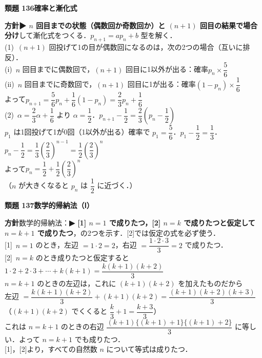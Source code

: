 \documentclass[a4paper,11pt]{ltjsarticle}
\newcommand{\ans}[2]{\Needspace{5\baselineskip}\vspace{6pt}%
  {\sffamily\bfseries 類題 #1\quad #2}\par}
\newcommand{\point}[1]{\textsf{\bfseries ▶ #1}}
\begin{document}
\ans{136}{確率と漸化式}
\begin{kai}
\textbf{方針}\quad \point{$n$ 回目までの状態（偶数回か奇数回か）と $(n+1)$ 回目の結果で場合分け}して漸化式をつくる．$p_{n+1}=ap_n+b$ 型を解く．\\[2pt]
(1)\ $(n+1)$ 回投げて1の目が偶数回になるのは，次の2つの場合（互いに排反）．\\
\hspace*{1.5em}(i)\ $n$ 回目までに偶数回で，$(n+1)$ 回目に1以外が出る：確率\quad $p_n\times\dfrac56$\\
\hspace*{1.5em}(ii)\ $n$ 回目までに奇数回で，$(n+1)$ 回目に1が出る：確率\quad $(1-p_n)\times\dfrac16$\\
\hspace*{1.5em}よって\quad $p_{n+1}=\dfrac56p_n+\dfrac16(1-p_n)=\dfrac23p_n+\dfrac16$\\[2pt]
(2)\ $\alpha=\dfrac23\alpha+\dfrac16$ より $\alpha=\dfrac12$．\quad $p_{n+1}-\dfrac12=\dfrac23\left(p_n-\dfrac12\right)$\\
\hspace*{1.5em}$p_1$ は1回投げて1が0回（1以外が出る）確率で $p_1=\dfrac56$．$p_1-\dfrac12=\dfrac13$．\\
\hspace*{1.5em}$p_n-\dfrac12=\dfrac13\left(\dfrac23\right)^{n-1}=\dfrac12\left(\dfrac23\right)^n$\\
\hspace*{1.5em}よって\quad $p_n=\dfrac12+\dfrac12\left(\dfrac23\right)^n$\\
\hspace*{1.5em}（$n$ が大きくなると $p_n$ は $\dfrac12$ に近づく．）
\end{kai}

\ans{137}{数学的帰納法（Ⅰ）}
\begin{kai}
\textbf{方針}\quad 数学的帰納法：\point{[1] $n=1$ で成りたつ，[2] $n=k$ で成りたつと仮定して $n=k+1$ で成りたつ}，の2つを示す．[2]では仮定の式を必ず使う．\\[2pt]
{[1]}\ $n=1$ のとき，左辺 $=1\cdot2=2$，右辺 $=\dfrac{1\cdot2\cdot3}3=2$ で成りたつ．\\[2pt]
{[2]}\ $n=k$ のとき成りたつと仮定すると\quad $1\cdot2+2\cdot3+\cdots+k(k+1)=\dfrac{k(k+1)(k+2)}3$\\
\hspace*{1.5em}$n=k+1$ のときの左辺は，これに $(k+1)(k+2)$ を加えたものだから\\
\hspace*{1.5em}左辺 $=\dfrac{k(k+1)(k+2)}3+(k+1)(k+2)=\dfrac{(k+1)(k+2)(k+3)}3$\\
\hspace*{1.5em}（$(k+1)(k+2)$ でくくると $\dfrac{k}{3}+1=\dfrac{k+3}3$）\\
\hspace*{1.5em}これは $n=k+1$ のときの右辺 $\dfrac{(k+1)\{(k+1)+1\}\{(k+1)+2\}}3$ に等しい．よって $n=k+1$ でも成りたつ．\\[2pt]
{[1]}，[2]より，すべての自然数 $n$ について等式は成りたつ．
\end{kai}
\end{document}
